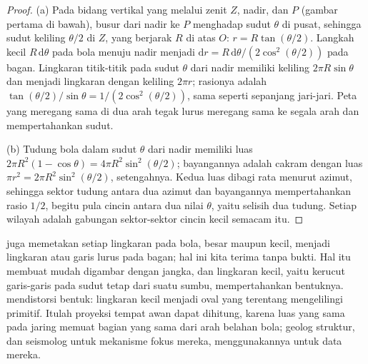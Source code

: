 \begin{proof}
(a) Pada bidang vertikal yang melalui zenit $Z$, nadir, dan $P$
(gambar pertama di bawah), busur dari nadir ke $P$
menghadap sudut $\theta$ di pusat, sehingga sudut keliling
$\theta/2$ di $Z$, yang berjarak $R$ di atas $O$: $r =
R\tan(\theta/2)$. Langkah kecil $R\,\mathrm d\theta$ pada bola menuju
nadir menjadi $\mathrm dr = R\,\mathrm d\theta/(2\cos^2(\theta/2))$ pada
bagan. Lingkaran titik-titik pada sudut $\theta$ dari nadir memiliki
keliling $2\pi R\sin\theta$ dan menjadi lingkaran dengan keliling $2\pi
r$; rasionya adalah $\tan(\theta/2)/\sin\theta = 1/(2\cos^2(\theta/2))$, sama
seperti sepanjang jari-jari. Peta yang meregang sama di dua arah tegak lurus
meregang sama ke segala arah dan mempertahankan sudut.

(b) Tudung bola dalam sudut $\theta$ dari nadir memiliki luas
$2\pi R^2(1 - \cos\theta) = 4\pi R^2\sin^2(\theta/2)$; bayangannya adalah cakram
dengan luas $\pi r^2 = 2\pi R^2\sin^2(\theta/2)$, setengahnya. Kedua luas
dibagi rata menurut azimut, sehingga sektor tudung antara dua azimut
dan bayangannya mempertahankan rasio $1/2$, begitu pula cincin antara dua nilai
$\theta$, yaitu selisih dua tudung. Setiap wilayah adalah gabungan sektor-sektor
cincin kecil semacam itu.
\end{proof}

 juga memetakan setiap lingkaran pada bola, besar maupun
kecil, menjadi lingkaran atau garis lurus pada bagan; hal ini kita terima tanpa bukti. Hal itu membuat
 mudah digambar dengan jangka, dan lingkaran kecil, yaitu kerucut
garis-garis pada sudut tetap dari suatu sumbu, mempertahankan bentuknya.  mendistorsi bentuk: lingkaran kecil menjadi oval yang terentang
mengelilingi primitif. Itulah proyeksi tempat awan  dapat
dihitung, karena luas yang sama pada jaring memuat bagian yang sama dari
arah belahan bola; geolog struktur, dan seismolog untuk
mekanisme fokus mereka, menggunakannya untuk data mereka.

